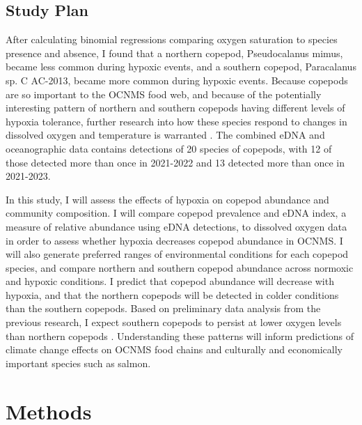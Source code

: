 \documentclass[12pt,twoside]{reedthesis}
\begin{document}
\clearpage 

\section{Study Plan}

After calculating binomial regressions comparing oxygen saturation to species presence and absence, I found that a northern copepod, Pseudocalanus mimus, became less common during hypoxic events, and a southern copepod, Paracalanus sp. C AC-2013, became more common during hypoxic events. Because copepods are so important to the OCNMS food web, and because of the potentially interesting pattern of northern and southern copepods having different levels of hypoxia tolerance, further research into how these species respond to changes in dissolved oxygen and temperature is warranted \autocite{NOAAFisheries2024}. The combined eDNA and oceanographic data contains detections of 20 species of copepods, with 12 of those detected more than once in 2021-2022 and 13 detected more than once in 2021-2023.

In this study, I will assess the effects of hypoxia on copepod abundance and community composition. I will compare copepod prevalence and eDNA index, a measure of relative abundance using eDNA detections, to dissolved oxygen data in order to assess whether hypoxia decreases copepod abundance in OCNMS. I will also generate preferred ranges of environmental conditions for each copepod species, and compare northern and southern copepod abundance across normoxic and hypoxic conditions. I predict that copepod abundance will decrease with hypoxia, and that the northern copepods will be detected in colder conditions than the southern copepods. Based on preliminary data analysis from the previous research, I expect southern copepods to persist at lower oxygen levels than northern copepods \autocite{Crotty2024}. Understanding these patterns will inform predictions of climate change effects on OCNMS food chains and culturally and economically important species such as salmon.
	
    \chapter{Methods}
\end{document}
